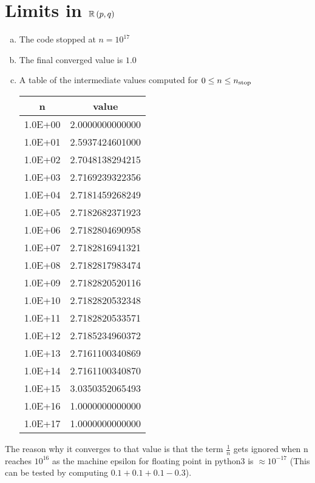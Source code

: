 \section{Limits in $\mathbb{R}\left(p,q\right)$}

\begin{enumerate}[(a)]
	\item The code stopped at $n = 10^{17}$
	\item The final converged value is $1.0$
	\item A table of the intermediate values computed for $0 \leq n \leq n_{\mathrm{stop}}$
	\begin{table}[H]
		\centering
		\begin{tabular}{c|c}
		n 	& value \\
		\hline
		1.0E+00 & 2.0000000000000 \\
		1.0E+01 & 2.5937424601000 \\
		1.0E+02 & 2.7048138294215 \\
		1.0E+03 & 2.7169239322356 \\
		1.0E+04 & 2.7181459268249 \\
		1.0E+05 & 2.7182682371923 \\
		1.0E+06 & 2.7182804690958 \\
		1.0E+07 & 2.7182816941321 \\
		1.0E+08 & 2.7182817983474 \\
		1.0E+09 & 2.7182820520116 \\
		1.0E+10 & 2.7182820532348 \\
		1.0E+11 & 2.7182820533571 \\
		1.0E+12 & 2.7185234960372 \\
		1.0E+13 & 2.7161100340869 \\
		1.0E+14 & 2.7161100340870 \\
		1.0E+15 & 3.0350352065493 \\
		1.0E+16 & 1.0000000000000 \\
		1.0E+17 & 1.0000000000000 		
		\end{tabular}
	\end{table}
\end{enumerate}
The reason why it converges to that value is that the term $\frac{1}{n}$ gets ignored when n reaches $10^{16}$ as the machine epsilon for floating point in python3 is $\approx 10^{-17}$ (This can be tested by computing $0.1+0.1+0.1-0.3$).